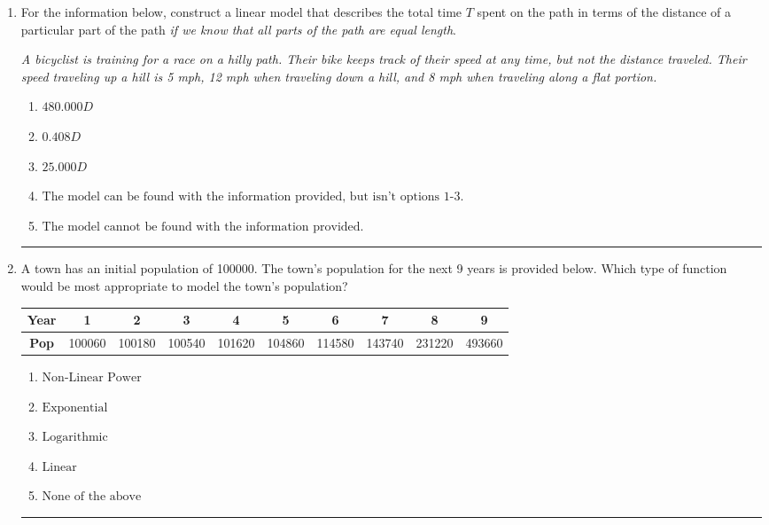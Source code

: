 \documentclass[14pt]{extbook}
\newcommand{\litem}[1]{\item#1\hspace*{-1cm}\rule{\textwidth}{0.4pt}}
\begin{document}
\begin{enumerate}
{\begin{enumerate}[label=\Alph*.]
\end{enumerate} }
\litem{
For the information below, construct a linear model that describes the total time $T$ spent on the path in terms of the distance of a particular part of the path \textit{if we know that all parts of the path are equal length}.
\begin{center}
    \textit{ A bicyclist is training for a race on a hilly path. Their bike keeps track of their speed at any time, but not the distance traveled. Their speed traveling up a hill is 5 mph, 12 mph when traveling down a hill, and 8 mph when traveling along a flat portion. }
\end{center}
\begin{enumerate}[label=\Alph*.]
\item \( 480.000 D \)
\item \( 0.408 D \)
\item \( 25.000 D \)
\item \( \text{The model can be found with the information provided, but isn't options 1-3.} \)
\item \( \text{The model cannot be found with the information provided.} \)

\end{enumerate} }
\litem{
A town has an initial population of 100000. The town's population for the next 9 years is provided below. Which type of function would be most appropriate to model the town's population?

\begin{tabular}{c|c|c|c|c|c|c|c|c|c}
\textbf{Year} &1 &2 &3 &4 &5 &6 &7 &8 &9\tabularnewline \hline
\textbf{Pop} &100060 &100180 &100540 &101620 &104860 &114580 &143740 &231220 &493660\end{tabular}\begin{enumerate}[label=\Alph*.]
\item \( \text{Non-Linear Power} \)
\item \( \text{Exponential} \)
\item \( \text{Logarithmic} \)
\item \( \text{Linear} \)
\item \( \text{None of the above} \)


\end{enumerate}}
\end{enumerate}
\end{document}
